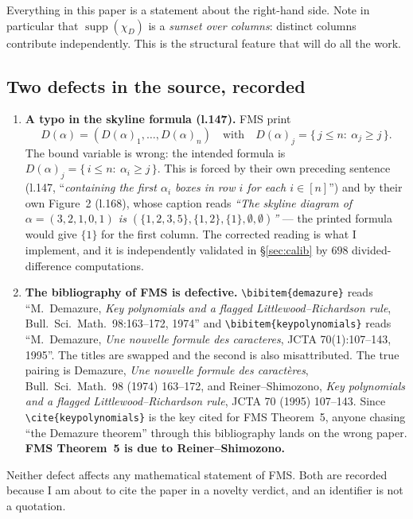 \documentclass[11pt]{article}
\theoremstyle{definition}
\DeclareMathOperator{\supp}{supp}
\begin{document}
Everything in this paper is a statement about the right-hand side. Note in particular that
$\supp(\chi_D)$ is a \emph{sumset over columns}: distinct columns contribute independently. This
is the structural feature that will do all the work.

\subsection{Two defects in the source, recorded}\label{sec:defects}

\begin{enumerate}
\item \textbf{A typo in the skyline formula (l.147).} FMS print
\[
  D(\alpha)=(D(\alpha)_1,\ldots,D(\alpha)_n)\quad\text{with}\quad
  D(\alpha)_j=\{\,j\le n:\ \alpha_j\ge j\,\}.
\]
The bound variable is wrong: the intended formula is $D(\alpha)_j=\{\,i\le n:\ \alpha_i\ge
j\,\}$. This is forced by their own preceding sentence (l.147, ``\emph{containing the first
$\alpha_i$ boxes in row $i$ for each $i\in[n]$}'') and by their own Figure~2 (l.168), whose
caption reads \emph{``The skyline diagram of $\alpha=(3,2,1,0,1)$ is $(\{1,2,3,5\},\{1,2\},
\{1\},\emptyset,\emptyset)$''} --- the printed formula would give $\{1\}$ for the first column.
The corrected reading is what I implement, and it is independently validated in
\S\ref{sec:calib} by $698$ divided-difference computations.

\item \textbf{The bibliography of FMS is defective.} \verb|\bibitem{demazure}| reads
``M.~Demazure, \emph{Key polynomials and a flagged Littlewood--Richardson rule}, Bull.\ Sci.\
Math.\ 98:163--172, 1974'' and \verb|\bibitem{keypolynomials}| reads ``M.~Demazure, \emph{Une
nouvelle formule des caracteres}, JCTA 70(1):107--143, 1995''. The titles are swapped and the
second is also misattributed. The true pairing is Demazure, \emph{Une nouvelle formule des
caract\`eres}, Bull.\ Sci.\ Math.\ 98 (1974) 163--172, and Reiner--Shimozono, \emph{Key
polynomials and a flagged Littlewood--Richardson rule}, JCTA 70 (1995) 107--143. Since
\verb|\cite{keypolynomials}| is the key cited for FMS Theorem~5, anyone chasing ``the Demazure
theorem'' through this bibliography lands on the wrong paper. \textbf{FMS Theorem~5 is due to
Reiner--Shimozono.}
\end{enumerate}

Neither defect affects any mathematical statement of FMS. Both are recorded because I am about
to cite the paper in a novelty verdict, and an identifier is not a quotation.
\end{document}

